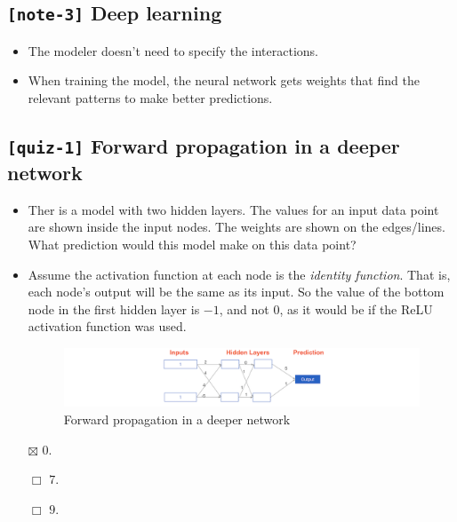 \documentclass[11pt, twoside]{article}
\begin{document}
    \hypertarget{note-3-deep-learning}{%
\subsection{\texorpdfstring{\texttt{{[}note-3{]}} Deep
learning}{{[}note-3{]} Deep learning}}\label{note-3-deep-learning}}

\begin{itemize}
\item
  The modeler doesn't need to specify the interactions.
\item
  When training the model, the neural network gets weights that find the
  relevant patterns to make better predictions.
\end{itemize}

    \hypertarget{quiz-1-forward-propagation-in-a-deeper-network}{%
\subsection{\texorpdfstring{\texttt{{[}quiz-1{]}} Forward propagation in
a deeper
network}{{[}quiz-1{]} Forward propagation in a deeper network}}\label{quiz-1-forward-propagation-in-a-deeper-network}}

\begin{itemize}
\item
  Ther is a model with two hidden layers. The values for an input data
  point are shown inside the input nodes. The weights are shown on the
  edges/lines. What prediction would this model make on this data point?
\item
  Assume the activation function at each node is the \emph{identity
  function}. That is, each node's output will be the same as its input.
  So the value of the bottom node in the first hidden layer is \(-1\),
  and not \(0\), as it would be if the ReLU activation function was
  used.

  \begin{figure}
  \centering
  \includegraphics{../Figures/11. Forward propagation in a deeper network.png}
  \caption{Forward propagation in a deeper network}
  \end{figure}

  \(\boxtimes\) \(0\).

  \(\Box\) \(7\).

  \(\Box\) \(9\).
\end{itemize}
\end{document}
